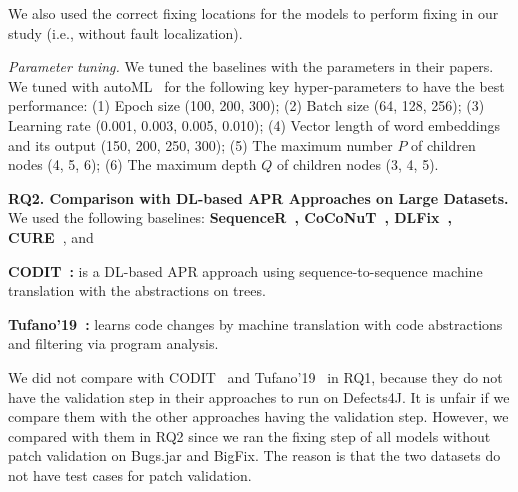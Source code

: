 
We also used the correct fixing locations for the models to perform
fixing in our study (i.e., without fault localization).



{\em Parameter tuning.} We tuned the baselines with the
parameters in their papers.
We tuned {\tool} with autoML~\cite{NNI} for the following key
hyper-parameters to have the best performance: (1) Epoch size (100,
200, 300); (2) Batch size (64, 128, 256); (3) Learning rate (0.001,
0.003, 0.005, 0.010); (4) Vector length of word embeddings and its
output (150, 200, 250, 300); (5) The maximum number $P$ of children
nodes (4, 5, 6); (6) The maximum depth $Q$ of children nodes (3, 4,
5).

\vspace{2pt} {\bf RQ2. Comparison with DL-based APR Approaches on
  Large Datasets.} We used the following baselines: {\bf
  Sequen\-ceR~\cite{chen2018sequencer},
  CoCoNuT~\cite{lutellier2020coconut}, DLFix~\cite{icse20},
  CURE~\cite{cure-icse21}}, and

{\bf CODIT~\cite{chakrabortycodit}:} is a DL-based APR approach
using sequence-to-sequence machine translation with the
abstractions on trees.

{\bf Tufano'19~\cite{tufano2019learning}:} learns code changes by
machine translation with code abstractions and
filtering via program analysis.

We did not compare with CODIT~\cite{chakrabortycodit} and
Tufano'19~\cite{tufano2019learning} in RQ1, because they do not have
the validation step in their approaches to run on Defects4J. It is
unfair if we compare them with the other approaches having the
validation step. However, we compared {\tool} with them in RQ2 since
we ran the fixing step of all models without patch validation on
Bugs.jar and BigFix. The reason is that the two datasets do not have
test cases for patch validation.

